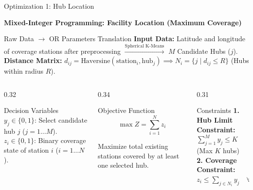 \documentclass[aspectratio=169,10pt]{beamer}
\begin{document}
\begin{frame}{Optimization 1: Hub Location}
\vspace{-0.1cm}
\begin{center}\color{Blue}\textbf{Mixed-Integer Programming: Facility Location (Maximum Coverage)}\end{center}
\vspace{0.1cm}

\begin{block}{Raw Data $\rightarrow$ OR Parameters Translation}
\scriptsize
\textbf{Input Data:} Latitude and longitude of coverage stations after preprocessing $\xrightarrow{\text{Spherical K-Means}}$ $M$ Candidate Hubs ($j$).\\
\textbf{Distance Matrix:} $d_{ij} = \text{Haversine}(\text{station}_i, \text{hub}_j) \implies N_i = \{j \mid d_{ij} \le R\}$ (Hubs within radius $R$).
\end{block}

\vspace{0.1cm}
\begin{columns}[T]
\begin{column}{0.32\textwidth}
\begin{block}{Decision Variables}
\scriptsize
\textbf{$y_j \in \{0,1\}$}: Select candidate hub $j$ ($j=1\dots M$).\\[1.5mm]
\textbf{$z_i \in \{0,1\}$}: Binary coverage state of station $i$ ($i=1\dots N$).
\end{block}
\end{column}

\begin{column}{0.34\textwidth}
\begin{block}{Objective Function}
\centering
\[
\boxed{\displaystyle \max Z = \sum_{i=1}^{N} z_i}
\]
\vspace{-1mm}
\raggedright
\scriptsize Maximize total existing stations covered by at least one selected hub.
\end{block}
\end{column}

\begin{column}{0.31\textwidth}
\begin{block}{Constraints}
\scriptsize
\textbf{1. Hub Limit Constraint:}\\
$\sum_{j=1}^{M} y_j \le K$ \quad (Max $K$ hubs)\\[1.5mm]
\textbf{2. Coverage Constraint:}\\
$z_i \le \sum_{j \in N_i} y_j \quad \forall i$
\end{block}
\end{column}
\end{columns}


\end{frame}
\end{document}

